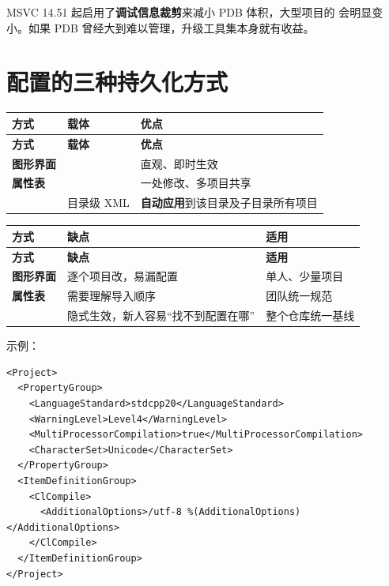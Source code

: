 {{\begin{tipbox}[提示]
MSVC 14.51 起启用了\textbf{调试信息裁剪}来减小 PDB 体积，大型项目的  会明显变小。如果 PDB 曾经大到难以管理，升级工具集本身就有收益。
\end{tipbox}

\section{配置的三种持久化方式}

\begin{longtable}{L{5.2cm}L{2.6cm}L{6.4cm}}
\toprule
\textbf{方式} & \textbf{载体} & \textbf{优点} \\
\midrule
\endfirsthead
\toprule
\textbf{方式} & \textbf{载体} & \textbf{优点} \\
\midrule
\endhead
\bottomrule
\endlastfoot
\textbf{图形界面} &  & 直观、即时生效 \\
\textbf{属性表} &  & 一处修改、多项目共享 \\
\textbf{} & 目录级 XML & \textbf{自动应用}到该目录及子目录所有项目 \\
\end{longtable}

\begin{longtable}{L{5.2cm}L{5.0cm}L{4.0cm}}
\toprule
\textbf{方式} & \textbf{缺点} & \textbf{适用} \\
\midrule
\endfirsthead
\toprule
\textbf{方式} & \textbf{缺点} & \textbf{适用} \\
\midrule
\endhead
\bottomrule
\endlastfoot
\textbf{图形界面} & 逐个项目改，易漏配置 & 单人、少量项目 \\
\textbf{属性表} & 需要理解导入顺序 & 团队统一规范 \\
\textbf{} & 隐式生效，新人容易“找不到配置在哪” & 整个仓库统一基线 \\
\end{longtable}

 示例：

\begin{lstlisting}[style=xmlstyle]
<Project>
  <PropertyGroup>
    <LanguageStandard>stdcpp20</LanguageStandard>
    <WarningLevel>Level4</WarningLevel>
    <MultiProcessorCompilation>true</MultiProcessorCompilation>
    <CharacterSet>Unicode</CharacterSet>
  </PropertyGroup>
  <ItemDefinitionGroup>
    <ClCompile>
      <AdditionalOptions>/utf-8 %(AdditionalOptions)</AdditionalOptions>
    </ClCompile>
  </ItemDefinitionGroup>
</Project>
\end{lstlisting}

}}
